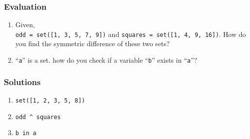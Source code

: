 \documentclass[17pt]{beamer}
\newcounter{saveenumi}
\newcommand{\conti}{\setcounter{enumi}{\value{saveenumi}}}
\begin{document}
\begin{frame}
\frametitle{Evaluation}
\label{sec-6.1}

\begin{enumerate}
\conti
\item Given,\\ \texttt{odd = set([1, 3, 5, 7, 9])} and \texttt{squares = set([1, 4, 9, 16])}. \pause
    How do you find the symmetric difference of these two sets?\pause
\item ``\texttt{a}'' is a set. how do you check if a variable ``\texttt{b}'' exists in ``\texttt{a}''?
\end{enumerate}
\end{frame}


\begin{frame}
\frametitle{Solutions}
\label{sec-7}

\begin{enumerate}
\item \texttt{set([1, 2, 3, 5, 8])}
\vspace{12pt}
\item \texttt{odd \^{} squares}
\vspace{12pt}
\item \texttt{b in a}
\end{enumerate}
\end{frame}
\end{document}
